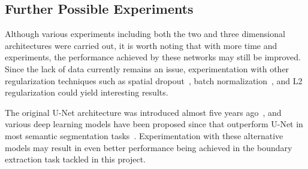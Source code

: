 \subsection{Further Possible Experiments}

Although various experiments including both the two and three dimensional architectures were carried out, it is worth noting that with more time and experiments, the performance achieved by these networks may still be improved. Since the lack of data currently remains an issue, experimentation with other regularization techniques such as spatial dropout~\cite{spatial}, batch normalization~\cite{batchnorm}, and L2 regularization could yield interesting results.

The original U-Net architecture was introduced almost five years ago~\cite{ronneberger2015u}, and various deep learning models have been proposed since that outperform U-Net in most semantic segmentation tasks~\cite{chen2018encoder, semanticseg-SOTA}. Experimentation with these alternative models may result in even better performance being achieved in the boundary extraction task tackled in this project.






